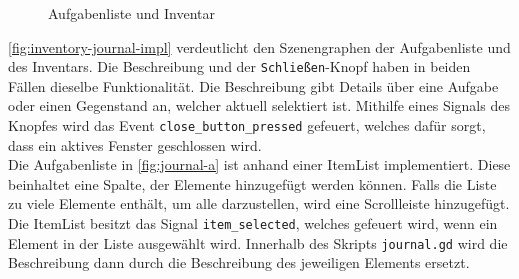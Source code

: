 \begin{figure}[H]%
    \centering
    \qquad
    \caption{Aufgabenliste und Inventar}%
    \label{fig:inventory-journal-impl}%
\end{figure}

\autoref{fig:inventory-journal-impl} verdeutlicht den Szenengraphen der Aufgabenliste und des Inventars. Die Beschreibung und der \texttt{Schließen}-Knopf haben in beiden Fällen dieselbe Funktionalität. Die Beschreibung gibt Details über eine Aufgabe oder einen Gegenstand an, welcher aktuell selektiert ist. Mithilfe eines Signals des Knopfes wird das Event \texttt{close\_button\_pressed} gefeuert, welches dafür sorgt, dass ein aktives Fenster geschlossen wird. \\

Die Aufgabenliste in \autoref{fig:journal-a} ist anhand einer ItemList implementiert\cite{godot-itemlist}. Diese beinhaltet eine Spalte, der Elemente hinzugefügt werden können. Falls die Liste zu viele Elemente enthält, um alle darzustellen, wird eine Scrollleiste hinzugefügt. Die ItemList besitzt das Signal \texttt{item\_selected}, welches gefeuert wird, wenn ein Element in der Liste ausgewählt wird. Innerhalb des Skripts \texttt{journal.gd} wird die Beschreibung dann durch die Beschreibung des jeweiligen Elements ersetzt.\\

